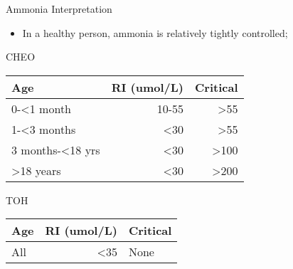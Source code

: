 \documentclass[presentation, smaller]{beamer}
\begin{document}
\begin{frame}[label={sec:orgheadline10}]{Ammonia Interpretation}
\begin{itemize}
\item In a healthy person, ammonia is relatively tightly controlled;
\end{itemize}
\begin{block}{CHEO}
\begin{center}
\begin{tabular}{lrr}
Age & RI (umol/L) & Critical\\
\hline
0-<1 month & 10-55 & >55\\
1-<3 months & <30 & >55\\
3 months-<18 yrs & <30 & >100\\
>18 years & <30 & >200\\
\end{tabular}
\end{center}
\end{block}

\begin{block}{TOH}
\begin{center}
\begin{tabular}{lrl}
Age & RI (umol/L) & Critical\\
\hline
All & <35 & None\\
\end{tabular}
\end{center}
\end{block}
\end{frame}
\end{document}
